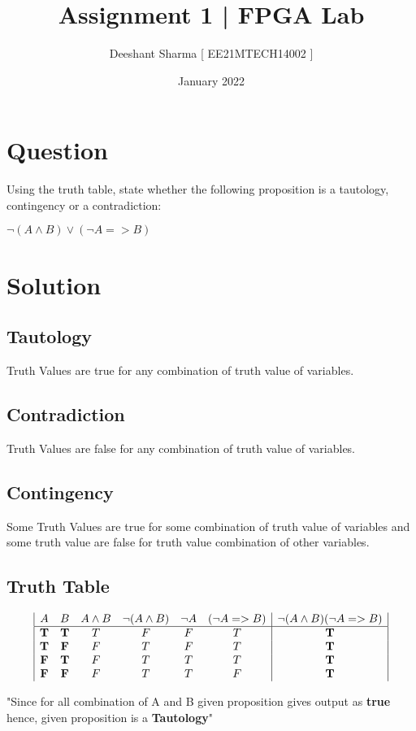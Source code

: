 \documentclass{article}
\title{\textbf{Assignment 1}  |\textbf{ FPGA Lab}}
\author{Deeshant Sharma [ EE21MTECH14002 ]}
\date{January 2022}
\begin{document}
\maketitle

\section{Question}

Using the truth table, state whether the following proposition is a tautology, contingency or a contradiction:
\begin{center}
    $ \neg( A \land B ) \lor ( \neg A => B ) $
\end{center}

\section{Solution}

\subsection{Tautology}
Truth Values are true for any combination of truth value of variables.

\subsection{Contradiction}
Truth Values are false for any combination of truth value of variables.

\subsection{Contingency}
Some Truth Values are true for some combination of truth value of variables and some truth value are false for  truth value combination of other variables.


\subsection{Truth Table}
\begin{displaymath}
\begin{array}{|c c c c c c|c|}
A & B & A \land B & \neg(A \land B) & \neg A & (\neg A => B ) & \neg (A \land B)(\neg A => B) \\ %
\hline %
\textbf{T} & \textbf{T} & T & F & F & T & \textbf{T}\\
\textbf{T} & \textbf{F} & F & T & F & T & \textbf{T}\\
\textbf{F} & \textbf{T} & F & T & T & T & \textbf{T}\\
\textbf{F} & \textbf{F} & F & T & T & F & \textbf{T}\\
\end{array}
\end{displaymath}

"Since for all combination of A and B given proposition gives output as \textbf{true} hence, given proposition is a \textbf{Tautology}" 
\end{document}
